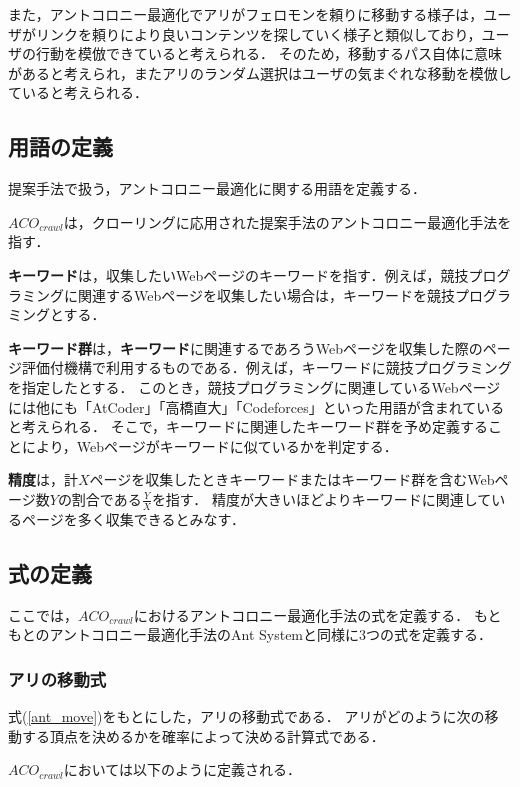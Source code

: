 また，アントコロニー最適化でアリがフェロモンを頼りに移動する様子は，ユーザがリンクを頼りにより良いコンテンツを探していく様子と類似しており，ユーザの行動を模倣できていると考えられる．
そのため，移動するパス自体に意味があると考えられ，またアリのランダム選択はユーザの気まぐれな移動を模倣していると考えられる．


\subsection{用語の定義}

提案手法で扱う，アントコロニー最適化に関する用語を定義する．

\(ACO_{crawl}\)は，クローリングに応用された提案手法のアントコロニー最適化手法を指す．

{\bf キーワード}は，収集したいWebページのキーワードを指す．例えば，競技プログラミングに関連するWebページを収集したい場合は，キーワードを競技プログラミングとする．

{\bf キーワード群}は，{\bf キーワード}に関連するであろうWebページを収集した際のページ評価付機構で利用するものである．例えば，キーワードに競技プログラミングを指定したとする．
このとき，競技プログラミングに関連しているWebページには他にも「AtCoder」「高橋直大」「Codeforces」といった用語が含まれていると考えられる．
そこで，キーワードに関連したキーワード群を予め定義することにより，Webページがキーワードに似ているかを判定する．

{\bf 精度}は，計\(X\)ページを収集したときキーワードまたはキーワード群を含むWebページ数\(Y\)の割合である\(\frac{Y}{X}\)を指す．
精度が大きいほどよりキーワードに関連しているページを多く収集できるとみなす．

\subsection{式の定義}

ここでは，\(ACO_{crawl}\)におけるアントコロニー最適化手法の式を定義する．
もともとのアントコロニー最適化手法のAnt Systemと同様に3つの式を定義する．

\subsubsection{アリの移動式}

式(\ref{ant_move})をもとにした，アリの移動式である．
アリがどのように次の移動する頂点を決めるかを確率によって決める計算式である．

\(ACO_{crawl}\)においては以下のように定義される．

